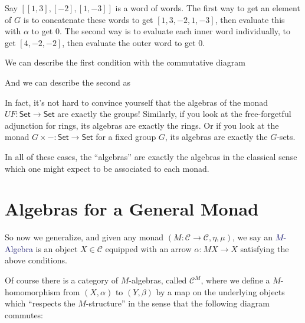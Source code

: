 \documentclass[12pt]{article}
\theoremstyle{definition}
\newcommand*{\catFont}[1]{\mathsf{#1}}
\newcommand*{\catVarFont}[1]{\mathcal{#1}}
\newcommand{\Set}{\catFont{Set}}
\newcommand{\catc}{\catVarFont{C}}
\newcommand*{\important}[1]{\textcolor{MidnightBlue}{#1}}
\begin{document}
Say $[[1,3],[-2],[1,-3]]$ is a word of words. The first way to get an
element of $G$ is to concatenate these words to get $[1,3,-2,1,-3]$,
then evaluate this with $\alpha$ to get $0$. The second way is to evaluate
each inner word individually, to get $[4,-2,-2]$, then evaluate the outer word
to get $0$. 

We can describe the first condition with the commutative diagram

\begin{center}
\end{center}

And we can describe the second as

\begin{center}
\end{center}

In fact, it's not hard to convince yourself that the algebras of the monad
$UF : \Set \to \Set$ are exactly the groups! Similarly, if you look at the 
free-forgetful adjunction for rings, its algebras are exactly the rings.
Or if you look at the monad $G \times - : \Set \to \Set$ for a fixed group $G$,
its algebras are exactly the $G$-sets.

In all of these cases, the ``algebras'' are exactly the algebras in the 
classical sense which one might expect to be associated to each monad.

\section{Algebras for a General Monad}

So now we generalize, and given any monad $(M : \catc \to \catc, \eta, \mu)$, we say an
\important{$M$-Algebra} is an object $X \in \catc$ equipped with an arrow
$\alpha : MX \to X$ satisfying the above conditions.

Of course there is a category of $M$-algebras, called $\catc^M$, where we define a 
$M$-homomorphism from $(X,\alpha)$ to $(Y,\beta)$ by 
a map on the underlying objects which ``respects the $M$-structure''
in the sense that the following diagram commutes:
\end{document}
